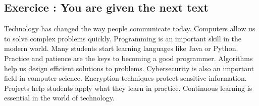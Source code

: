 \documentclass{article}
\begin{document}
\subsection*{Exercice : You are given the next text}Technology has changed the way people communicate today.
Computers allow us to solve complex problems quickly.
Programming is an important skill in the modern world.
Many students start learning languages like Java or Python.
Practice and patience are the keys to becoming a good programmer.
Algorithms help us design efficient solutions to problems.
Cybersecurity is also an important field in computer science.
Encryption techniques protect sensitive information.
Projects help students apply what they learn in practice.
Continuous learning is essential in the world of technology.
\end{document}

